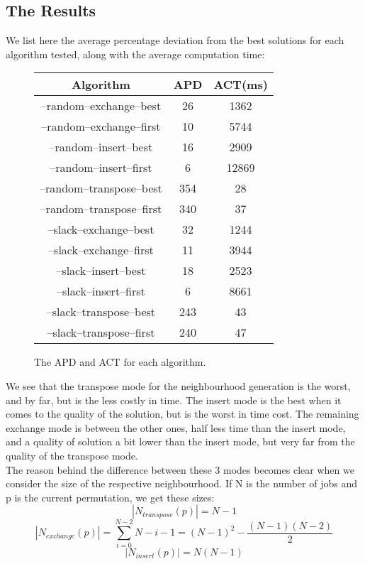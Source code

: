 \subsection{The Results}
We list here the average percentage deviation from the best solutions for each algorithm tested, along with the average computation time:

\begin{figure}[H]
\begin{center}
	\begin{tabular}{|c|c|c|} \hline
		Algorithm & APD & ACT(ms) \\ \hline \hline
		
		--random--exchange--best		& 26		& 1362 \\ \hline
		--random--exchange--first	& 10		& 5744 \\ \hline
		--random--insert--best		& 16		& 2909 \\ \hline
		--random--insert--first		& 6		& 12869 \\ \hline
		--random--transpose--best	& 354	& 28 \\ \hline
		--random--transpose--first	& 340	& 37 \\ \hline
		--slack--exchange--best		& 32		& 1244 \\ \hline
		--slack--exchange--first		& 11		& 3944 \\ \hline
		--slack--insert--best		& 18		& 2523 \\ \hline
		--slack--insert--first		& 6		& 8661 \\ \hline
		--slack--transpose--best		& 243	& 43 \\ \hline
		--slack--transpose--first	& 240	& 47 \\ \hline
	\end{tabular}
\end{center}
\caption{The APD and ACT for each algorithm.}
\label{al}
\end{figure}

We see that the transpose mode for the neighbourhood generation is the worst, and by far, but is the less costly in time. The insert mode is the best when it comes to the quality of the solution, but is the worst in time cost. The remaining exchange mode is between the other ones, half less time than the insert mode, and a quality of solution a bit lower than the insert mode, but very far from the quality of the transpose mode.\\

The reason behind the difference between these 3 modes becomes clear when we consider the size of the respective neighbourhood. If N is the number of jobs and p is the current permutation, we get these sizes:
$$|N_{transpose}(p)| = N-1$$
$$|N_{exchange}(p)| = \sum_{i=0}^{N-2}{N-i-1} = (N-1)^2 - \frac{(N-1)(N-2)}{2}$$
$$|N_{insert}(p)| = N(N-1)$$

